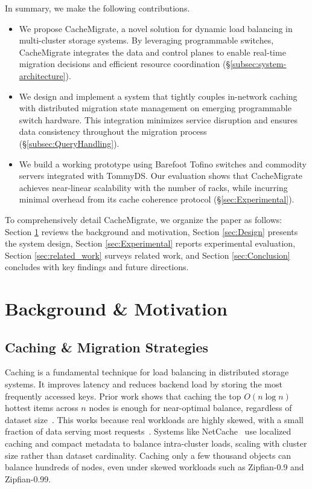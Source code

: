 \documentclass[conference]{IEEEtran}
\begin{document}
In summary, we make the following contributions.
\begin{itemize}
    \item We propose CacheMigrate, a novel solution for dynamic load balancing in multi-cluster storage systems. By leveraging programmable switches, CacheMigrate integrates the data and control planes to enable real-time migration decisions and efficient resource coordination (\S\ref{subsec:system-architecture}).
    \item We design and implement a system that tightly couples in-network caching with distributed migration state management on emerging programmable switch hardware. This integration minimizes service disruption and ensures data consistency throughout the migration process (\S\ref{subsec:QueryHandling}).
    \item We build a working prototype using Barefoot Tofino switches and commodity servers integrated with TommyDS. Our evaluation shows that CacheMigrate achieves near-linear scalability with the number of racks, while incurring minimal overhead from its cache coherence protocol (\S\ref{sec:Experimental}).
\end{itemize}

To comprehensively detail CacheMigrate, we organize the paper as follows: Section \ref{sec_back_ground} reviews the background and motivation, Section \ref{sec:Design} presents the system design, Section \ref{sec:Experimental} reports experimental evaluation, Section \ref{sec:related_work} surveys related work, and Section \ref{sec:Conclusion} concludes with key findings and future directions.


\section{Background \& Motivation}
\label{sec_back_ground}

\subsection{Caching \& Migration Strategies}

Caching is a fundamental technique for load balancing in distributed storage systems. It improves latency and reduces backend load by storing the most frequently accessed keys. Prior work shows that caching the top \(O (n \log n)\) hottest items across $n$ nodes is enough for near-optimal balance, regardless of dataset size~\cite{fan2011small}. This works because real workloads are highly skewed, with a small fraction of data serving most requests~\cite{atikoglu2012workload}. Systems like NetCache~\cite{jin2017netcache} use localized caching and compact metadata to balance intra-cluster loads, scaling with cluster size rather than dataset cardinality. Caching only a few thousand objects can balance hundreds of nodes, even under skewed workloads such as Zipfian-0.9 and Zipfian-0.99.
\end{document}
